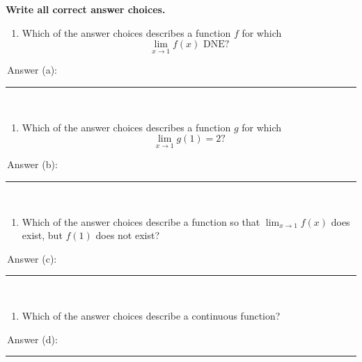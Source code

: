 \documentclass[11pt]{article}
\begin{document}
\begin{enumerate}
\bigskip
\hfill {\bf Write all correct answer choices.} \hfill \\



\begin{minipage}[t]{0.48\textwidth}
\begin{enumerate}
\item[(a)] Which of the answer choices describes a function $f$ for which 
\[
\lim_{x\to1}f(x) \text{ DNE?}
\]
\end{enumerate}

\,\hfill Answer (a): \rule[-8pt]{2in}{0.4pt}\\
\end{minipage}
%
\hfill
%
\begin{minipage}[t]{0.48\textwidth}
\begin{enumerate}
\item[(b)] Which of the answer choices describes a function $g$ for which 
\[
\lim_{x\to1}g(1)=2?
\]
\end{enumerate}

\,\hfill Answer (b): \rule[-8pt]{2in}{0.4pt}\\
\end{minipage}

\vspace{2cm}  %

\begin{minipage}[t]{0.48\textwidth}
\begin{enumerate}
\item[(c)] Which of the answer choices describe a function so that $\displaystyle \lim_{x\to1}f(x)$ does exist, but $f(1)$ does not exist?
\end{enumerate}

\,\hfill Answer (c): \rule[-8pt]{2in}{0.4pt}\\
\end{minipage}
%
\hfill
%
\begin{minipage}[t]{0.48\textwidth}
\begin{enumerate}
\item[(d)] Which of the answer choices describe a continuous function?\\
\end{enumerate}

\,\hfill Answer (d): \rule[-8pt]{2in}{0.4pt}\\
\end{minipage}
\newpage



\end{enumerate}
\end{document}
